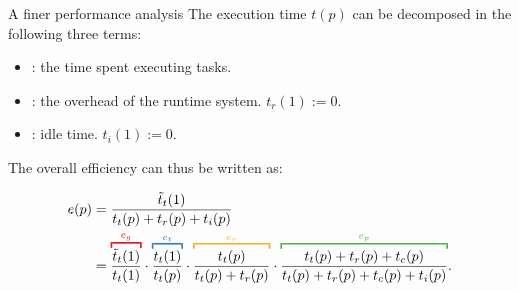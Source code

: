 \begin{frame}{A finer performance analysis}
  The execution time $t(p)$ can be decomposed in the following three
  terms:
  \begin{itemize}
  \item {}: the time spent executing tasks.
  \item {}: the overhead of the runtime system. \alert{$t_r(1):=0$}.
  \item {}: idle time. \alert{$t_i(1):=0$}.
  \end{itemize}

  The overall efficiency can thus be written as:
  

  
  


\begin{align*}
  e(p) & = \frac{ \tilde{t}_t(1) }{ t_t(p) + t_r(p) + t_i(p) } \\
       & = \mre{\overbracket{\mbk{\frac{ \tilde{t}_t(1) }{ t_t(1) }}}^{e_g}}\cdot 
  \mbl{\overbracket{\mbk{\frac{ t_t(1) }{ t_t(p) }}}^{e_{t}}}\cdot  
  \mye{\overbracket{\mbk{\frac{ t_t(p) }{ t_t(p)+t_r(p) }}}^{e_r}}\cdot
  \mgr{\overbracket{\mbk{\frac{ t_t(p)+t_r(p)+ t_c(p) }{ t_t(p) + t_r(p) + t_c(p) + t_i(p) }}}^{e_p}}.
\end{align*}



\end{frame}
